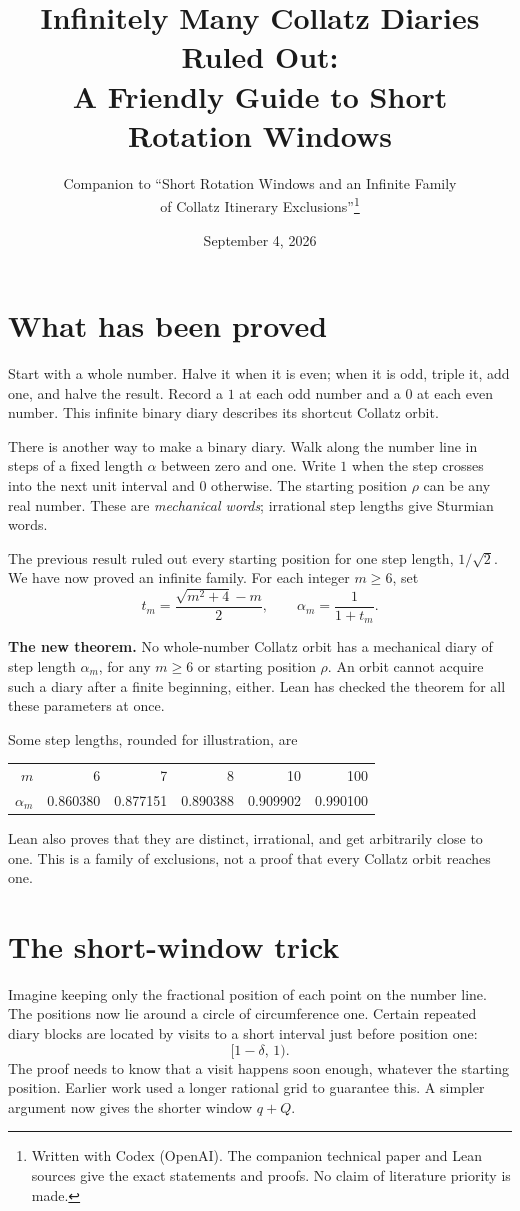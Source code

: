\documentclass[11pt]{article}
\title{Infinitely Many Collatz Diaries Ruled Out:\\
\Large A Friendly Guide to Short Rotation Windows}
\author{Companion to ``Short Rotation Windows and an Infinite Family\\of Collatz Itinerary Exclusions''\thanks{Written with Codex (OpenAI). The companion technical paper and Lean sources give the exact statements and proofs. No claim of literature priority is made.}}
\date{September 4, 2026}
\begin{document}
\maketitle

\section{What has been proved}
Start with a whole number. Halve it when it is even; when it is odd,
triple it, add one, and halve the result. Record a $1$ at each odd number
and a $0$ at each even number. This infinite binary diary describes its
shortcut Collatz orbit.

There is another way to make a binary diary. Walk along the number line
in steps of a fixed length $\alpha$ between zero and one. Write $1$ when
the step crosses into the next unit interval and $0$ otherwise. The
starting position $\rho$ can be any real number. These are
\emph{mechanical words}; irrational step lengths give Sturmian words.

The previous result ruled out every starting position for one step length,
$1/\sqrt2$. We have now proved an infinite family. For each integer
$m\ge6$, set
\[
t_m=\frac{\sqrt{m^2+4}-m}{2},\qquad \alpha_m=\frac1{1+t_m}.
\]
\begin{keyidea}
\textbf{The new theorem.} No whole-number Collatz orbit has a mechanical
diary of step length $\alpha_m$, for any $m\ge6$ or starting position
$\rho$. An orbit cannot acquire such a diary after a finite beginning,
either. Lean has checked the theorem for all these parameters at once.
\end{keyidea}
Some step lengths, rounded for illustration, are
\begin{center}
\begin{tabular}{rrrrrr}
\toprule
$m$&6&7&8&10&100\\
$\alpha_m$&0.860380&0.877151&0.890388&0.909902&0.990100\\
\bottomrule
\end{tabular}
\end{center}
Lean also proves that they are distinct, irrational, and get arbitrarily
close to one. This is a family of exclusions, not a proof that every
Collatz orbit reaches one.

\newpage
\section{The short-window trick}
Imagine keeping only the fractional position of each point on the number
line. The positions now lie around a circle of circumference one.
Certain repeated diary blocks are located by visits to a short interval
just before position one:
\[
[1-\delta,\,1).
\]
The proof needs to know that a visit happens soon enough, whatever the
starting position. Earlier work used a longer rational grid to guarantee
this. A simpler argument now gives the shorter window $q+Q$.
\end{document}
